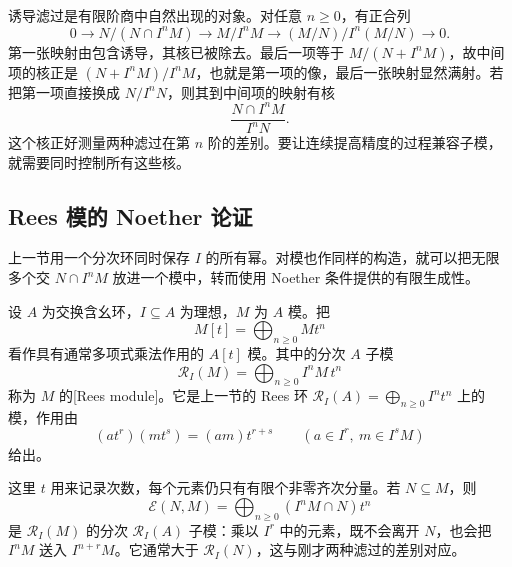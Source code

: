 \ProseParagraphBreak

诱导滤过是有限阶商中自然出现的对象。对任意 \(n\geq0\)，有正合列
\begin{equation}\label{g5:eq:induced-filtration-quotients}
	0\longrightarrow N/(N\cap I^nM)
	\longrightarrow M/I^nM
	\longrightarrow (M/N)/I^n(M/N)\longrightarrow0.
\end{equation}
第一张映射由包含诱导，其核已被除去。最后一项等于 \(M/(N+I^nM)\)，故中间项的核正是 \((N+I^nM)/I^nM\)，也就是第一项的像，最后一张映射显然满射。若把第一项直接换成 \(N/I^nN\)，则其到中间项的映射有核
\[
	\frac{N\cap I^nM}{I^nN}.
\]
这个核正好测量两种滤过在第 \(n\) 阶的差别。要让连续提高精度的过程兼容子模，就需要同时控制所有这些核。

\subsection{Rees 模的 Noether 论证}
\label{g5:subsec:0702:02}

上一节用一个分次环同时保存 \(I\) 的所有幂。对模也作同样的构造，就可以把无限多个交 \(N\cap I^nM\) 放进一个模中，转而使用 Noether 条件提供的有限生成性。

\begin{definition}\label{g5:def:rees-module}
	设 \(A\) 为交换含幺环，\(I\subseteq A\) 为理想，\(M\) 为 \(A\) 模。把
	\[
		M[t]=\bigoplus_{n\geq0}Mt^n
	\]
	看作具有通常多项式乘法作用的 \(A[t]\) 模。其中的分次 \(A\) 子模
	\[
		\mathcal R_I(M)=\bigoplus_{n\geq0}I^nM\,t^n
	\]
	称为 \(M\) 的[Rees module]。它是上一节的 Rees 环
	\(\mathcal R_I(A)=\bigoplus_{n\geq0}I^nt^n\) 上的模，作用由
	\[
		(at^r)(mt^s)=(am)t^{r+s}
		\qquad(a\in I^r,\ m\in I^sM)
	\]
	给出。
\end{definition}

这里 \(t\) 用来记录次数，每个元素仍只有有限个非零齐次分量。若 \(N\subseteq M\)，则
\[
	\mathcal E(N,M)=\bigoplus_{n\geq0}(I^nM\cap N)t^n
\]
是 \(\mathcal R_I(M)\) 的分次 \(\mathcal R_I(A)\) 子模：乘以 \(I^r\) 中的元素，既不会离开 \(N\)，也会把 \(I^nM\) 送入 \(I^{n+r}M\)。它通常大于 \(\mathcal R_I(N)\)，这与刚才两种滤过的差别对应。

